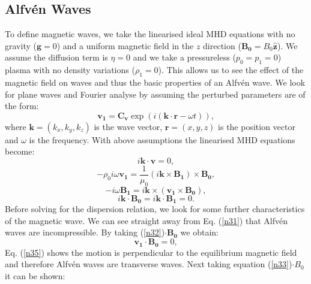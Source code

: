 \documentclass[12pt,a4paper,twoside]{article}
\newcommand{\Alfven}{Alfv\'{e}n }
\begin{document}
\subsection{\Alfven Waves}\label{c2}
To define magnetic waves, we take the linearised ideal MHD equations with no gravity ($\boldsymbol{g}=0$) and a uniform magnetic field in the $z$ direction ($\boldsymbol{B_0}=B_0 \boldsymbol{\hat{z}}$). We assume the diffusion term is $\eta=0$ and we take a pressureless ($p_0=p_1=0$) plasma with no density variations ($\rho_1=0$). This allows us to see the effect of the magnetic field on waves and thus the basic properties of an \Alfven wave. We look for plane waves and Fourier analyse by assuming the perturbed parameters are of the form:  
\begin{equation}
\boldsymbol{v_1} = \boldsymbol{C_{v}} \exp(i(\boldsymbol{k} \cdot \boldsymbol{r}- \omega t)),
\end{equation}
where $\boldsymbol{k} = (k_x,k_y,k_z)$ is the wave vector, $\boldsymbol{r} = (x,y,z)$ is the position vector and $\omega$ is the frequency. With above assumptions the linearised MHD equations become:
\begin{equation}\label{n31}
i \boldsymbol{k} \cdot \boldsymbol{v} = 0,
\end{equation}
\begin{equation}\label{n32}
- \rho_0 i \omega \boldsymbol{v_1} = \frac{1}{\mu_0} (i \boldsymbol{k} \times \boldsymbol{B_1}) \times \boldsymbol{B_0},
\end{equation}
\begin{equation}\label{n33}
-i \omega \boldsymbol{B_1} = i \boldsymbol{k} \times (\boldsymbol{v_1} \times \boldsymbol{B_0}),
\end{equation}
\begin{equation}\label{n34}
i \boldsymbol{k} \cdot \boldsymbol{B_0} = i \boldsymbol{k} \cdot \boldsymbol{B_1} = 0.
\end{equation}
Before solving for the dispersion relation, we look for some further characteristics of the magnetic wave. We can see straight away from Eq. (\ref{n31}) that \Alfven waves are incompressible. By taking (\ref{n32})$\cdot \boldsymbol{B_0}$ we obtain:
\begin{equation}\label{n35}
\boldsymbol{v_1} \cdot \boldsymbol{B_0} = 0,
\end{equation}
Eq. (\ref{n35}) shows the motion is perpendicular to the equilibrium magnetic field and therefore \Alfven waves are transverse waves. Next taking equation (\ref{n33})$\cdot B_0$ it can be shown:
\end{document}
